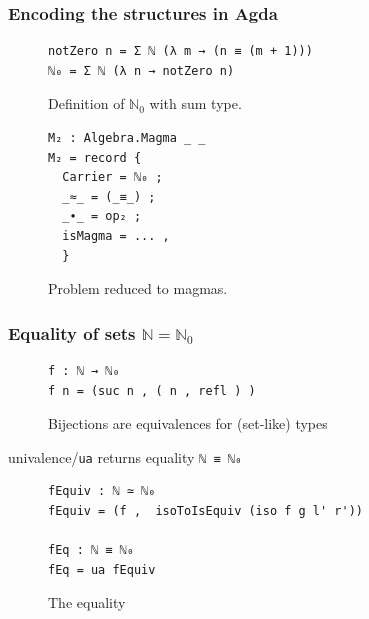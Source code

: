\documentclass[english,handout]{beamer}
\begin{document}
\begin{frame}[fragile]
\frametitle{Encoding the structures in Agda}




\begin{figure}
\begin{BVerbatim}
notZero n = Σ ℕ (λ m → (n ≡ (m + 1)))
ℕ₀ = Σ ℕ (λ n → notZero n) 
\end{BVerbatim}
\caption{Definition of $\mathbb{N}_0$ with sum type.}
\end{figure}


\begin{figure}
\begin{BVerbatim}
M₂ : Algebra.Magma _ _
M₂ = record { 
  Carrier = ℕ₀ ;
  _≈_ = (_≡_) ;
  _∙_ = op₂ ;
  isMagma = ... ,
  }
 \end{BVerbatim}
 \caption{Problem reduced to magmas.}
\end{figure}


\end{frame}

\begin{frame}[fragile]
\frametitle{Equality of sets $\mathbb{N} = \mathbb{N}_0$}


\begin{figure}
\begin{BVerbatim}
f : ℕ → ℕ₀ 
f n = (suc n , ( n , refl ) )
\end{BVerbatim}
\caption{Bijections are equivalences for (set-like) types}
\end{figure}

 univalence/\texttt{ua} returns equality \texttt{ℕ ≡ ℕ₀}
 
 
 \begin{figure}
 \begin{BVerbatim}
fEquiv : ℕ ≃ ℕ₀ 
fEquiv = (f ,  isoToIsEquiv (iso f g l' r'))

fEq : ℕ ≡ ℕ₀ 
fEq = ua fEquiv
 \end{BVerbatim}
 \caption{The equality}
\end{figure}

\end{frame}
\end{document}
